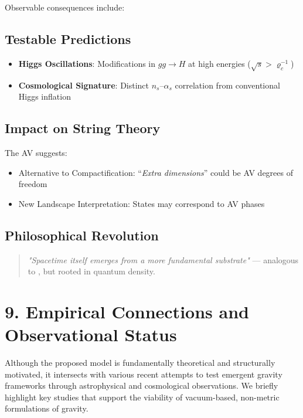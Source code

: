 \documentclass[twoside]{article}
\theoremstyle{definition}
\theoremstyle{remark}
\numberwithin{equation}{section}
\theoremstyle{definition}
\theoremstyle{example}
\theoremstyle{remark}
\numberwithin{equation}{section}%
\begin{document}
	
	
	Observable consequences include:
	
	\subsection{Testable Predictions}
	
	\begin{itemize}
		\item \textbf{Higgs Oscillations}: Modifications in $gg \to H$ at high energies ($\sqrt{s} > \varrho_c^{-1}$)
		\item \textbf{Cosmological Signature}: Distinct $n_s$–$\alpha_s$ correlation from conventional Higgs inflation \cite{Bezrukov2008}
	\end{itemize}
	
	\subsection{Impact on String Theory}
	
	The AV suggests:
	
	\begin{itemize}
		\item Alternative to Compactification: ``\textit{Extra dimensions}'' could be AV degrees of freedom
		\item New Landscape Interpretation: States may correspond to AV phases
	\end{itemize}
	
	\subsection{Philosophical Revolution}
	
	\begin{quote}
		\textit{"Spacetime itself emerges from a more fundamental substrate"} — analogous to \cite{volovik2003}, but rooted in quantum density.
	\end{quote}
	
\section*{9. Empirical Connections and Observational Status}

Although the proposed model is fundamentally theoretical and structurally motivated, it intersects with various recent attempts to test emergent gravity frameworks through astrophysical and cosmological observations. We briefly highlight key studies that support the viability of vacuum-based, non-metric formulations of gravity.
\end{document}
